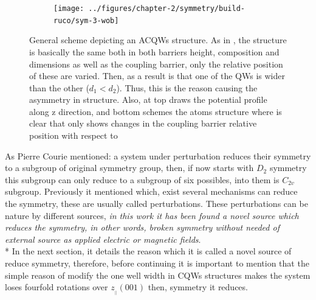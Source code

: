 \begin{figure}[ht!]
	\centering
	\begin{subfigure}{\textwidth}
	\texttt{[image: ../figures/chapter-2/symmetry/build-ruco/sym-3-wob]}
	\label{subfig:subsubsec:chapter-2-acoupled-quantum-wells-a}
	\label{subfig:subsubsec:chapter-2-acoupled-quantum-wells-b}
	\end{subfigure}
	\caption
	{
	General scheme  depicting an ACQWs structure. As in , the structure is basically the same both in both barriers height, composition and dimensions as well as the coupling barrier, only the relative position of these are varied. Then, as a result is that one of the QWs is wider than the other ($d_{1}<d_{2}$). Thus, this is the reason causing the asymmetry in structure. Also, at top  draws the potential profile along z direction, and bottom  schemes the atoms structure where is clear that only shows changes in the coupling barrier relative position with respect to 
	}
	\label{fig:subsubsec:chapter-2-acoupled-quantum-wells}
\end{figure}

As Pierre Courie mentioned\cite{curie1894symetrie,sep-symmetry-breaking,shubnikov1988works}:  a system under perturbation reduces their symmetry to a subgroup of  original symmetry group, then, if now starts with $D_{2}$ symmetry this subgroup can only reduce to a subgroup of six possibles, into them is $C_{2v}$ subgroup. Previously it mentioned which, exist several mechanisms can reduce the symmetry, these are usually called  perturbations. These perturbations can be nature by different sources, \emph{in this work it has been  found a novel source which reduces the symmetry,  in other words,  broken symmetry  without needed of external source as applied electric or magnetic fields}.  \\*
In the next section, it details the reason which it is called  a novel source of reduce symmetry, therefore, before continuing it is important to mention that the simple reason of modify the one well width in \gls{CQWs} structures makes the system loses fourfold rotations over $z_{_{\parallel}}(001)$  then,  symmetry it reduces. 

